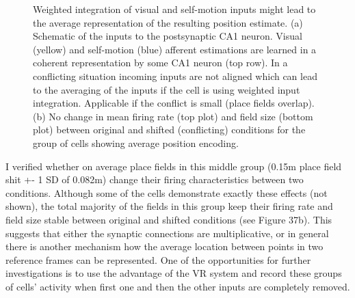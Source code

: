 \begin{figure}
\captionsetup{format=plain}
\caption[Encoding average]{
Weighted integration of visual and self-motion inputs might lead to the average representation of the resulting position estimate. (a) Schematic of the inputs to the postsynaptic CA1 neuron. Visual (yellow) and self-motion (blue) afferent estimations are learned in a coherent representation by some CA1 neuron (top row). In a conflicting situation incoming inputs are not aligned which can lead to the averaging of the inputs if the cell is using weighted input integration. Applicable if the conflict is small (place fields overlap). (b) No change in mean firing rate (top plot) and field size (bottom plot) between original and shifted (conflicting) conditions for the group of cells showing average position encoding.
}
\label{fig:F37_encoding_average}
\end{figure}

I verified whether on average place fields in this middle group (0.15m place field shit +- 1 SD of 0.082m) change their firing characteristics between two conditions. Although some of the cells demonstrate exactly these effects (not shown), the total majority of the fields in this group keep their firing rate and field size stable between original and shifted conditions (see Figure 37b). This suggests that either the synaptic connections are multiplicative, or in general there is another mechanism how the average location between points in two reference frames can be represented. One of the opportunities for further investigations is to use the advantage of the VR system and record these groups of cells’ activity when first one and then the other inputs are completely removed.


